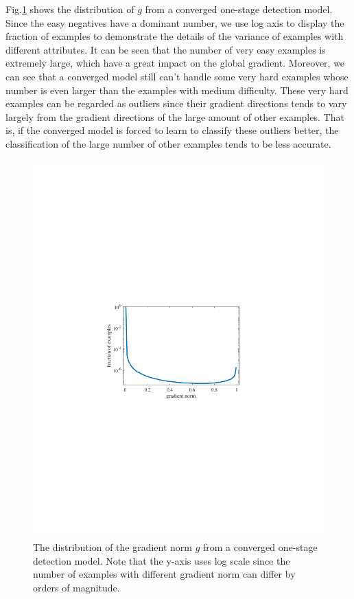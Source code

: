 \documentclass[letterpaper]{article} %
\begin{document}
Fig.\ref{fig:cls_dist_log} shows the distribution of $g$ from a converged one-stage detection model. Since the easy negatives have a dominant number, we use log axis to display the fraction of examples to demonstrate the details of the variance of examples with different attributes. It can be seen that the number of very easy examples is extremely large, which have a great impact on the global gradient. Moreover, we can see that a converged model still can't handle some very hard examples whose number is even larger than the examples with medium difficulty. These very hard examples can be regarded as outliers since their gradient directions tends to vary largely from the gradient directions of the large amount of other examples. That is, if the converged model is forced to learn to classify these outliers better, the classification of the large number of other examples tends to be less accurate.
\begin{figure}[ht]
\centering
\includegraphics[width=0.8\linewidth]{figs/cls_dist_log}
\caption{The distribution of the gradient norm $g$ from a converged one-stage detection model. Note that the y-axis uses log scale since the number of examples with different gradient norm can differ by orders of magnitude.}
\label{fig:cls_dist_log}
\end{figure}
\end{document}
